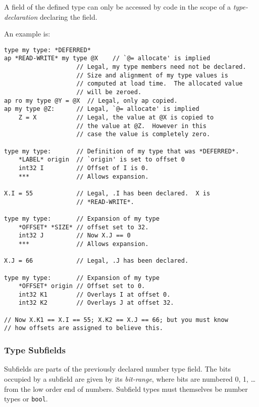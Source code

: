 \documentclass[12pt]{article}
\newenvironment{indpar}[1][0.3in]%
	{\begin{list}{}%
		     {\setlength{\itemsep}{0in}%
		      \setlength{\topsep}{0in}%
		      \setlength{\parsep}{1ex}%
		      \setlength{\labelwidth}{#1}%
		      \setlength{\leftmargin}{#1}%
		      \addtolength{\leftmargin}{\labelsep}}%
	 \item}%
	{\end{list}}
\begin{document}
A field of
the defined type can only be accessed by code in the scope
of a {\em type-declaration} declaring the field.

An example is:

\begin{indpar}\begin{verbatim}
type my type: *DEFERRED*
ap *READ-WRITE* my type @X    // `@= allocate' is implied
                    // Legal, my type members need not be declared.
                    // Size and alignment of my type values is
                    // computed at load time.  The allocated value
                    // will be zeroed.
ap ro my type @Y = @X  // Legal, only ap copied.
ap my type @Z:      // Legal, `@= allocate' is implied
    Z = X           // Legal, the value at @X is copied to
                    // the value at @Z.  However in this
                    // case the value is completely zero.

type my type:       // Definition of my type that was *DEFERRED*.
    *LABEL* origin  // `origin' is set to offset 0
    int32 I         // Offset of I is 0.
    ***             // Allows expansion.

X.I = 55            // Legal, .I has been declared.  X is
                    // *READ-WRITE*.

type my type:       // Expansion of my type
    *OFFSET* *SIZE* // offset set to 32.
    int32 J         // Now X.J == 0
    ***             // Allows expansion.

X.J = 66            // Legal, .J has been declared.

type my type:       // Expansion of my type
    *OFFSET* origin // Offset set to 0.
    int32 K1        // Overlays I at offset 0.
    int32 K2        // Overlays J at offset 32.

// Now X.K1 == X.I == 55; X.K2 == X.J == 66; but you must know
// how offsets are assigned to believe this.
\end{verbatim}\end{indpar}

\subsubsection{Type Subfields}

Subfields are parts of the previously declared number type field.
The bits occupied
by a subfield are given by its {\em bit-range}, where bits are numbered
0, 1, \ldots{} from the low order end of numbers.
Subfield types must themselves be number types or {\tt bool}.
\end{document}
